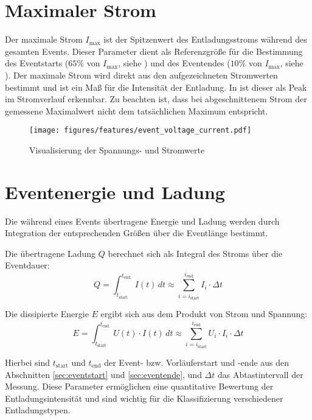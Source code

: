 \section{Maximaler Strom}
\label{sec:maxcurrent}
Der maximale Strom \(I_{\text{max}}\) ist der Spitzenwert des Entladungsstroms während des gesamten Events. Dieser Parameter dient als Referenzgröße für die Bestimmung des Eventstarts (\(65\%\) von \(I_{\text{max}}\), siehe ) und des Eventendes (\(10\%\) von \(I_{\text{max}}\), siehe ). Der maximale Strom wird direkt aus den aufgezeichneten Stromwerten bestimmt und ist ein Maß für die Intensität der Entladung. In  ist dieser als Peak im Stromverlauf erkennbar. Zu beachten ist, dass bei abgeschnittenem Strom der gemessene Maximalwert nicht dem tatsächlichen Maximum entspricht.

\begin{figure}[H]
  \centering
  \texttt{[image: figures/features/event\_voltage\_current.pdf]}
  \caption{Visualisierung der Spannungs- und Stromwerte}
  \label{fig:event_voltage_current}
\end{figure}


\section{Eventenergie und Ladung}
\label{sec:eventenergy_charge}
Die während eines Events übertragene Energie und Ladung werden durch Integration der entsprechenden Größen über die Eventlänge bestimmt.

Die übertragene Ladung \(Q\) berechnet sich als Integral des Stroms über die Eventdauer:
\begin{equation}
Q = \int_{t_{\text{start}}}^{t_{\text{end}}} I(t) \, dt \approx \sum_{i=i_{\text{start}}}^{i_{\text{end}}} I_i \cdot \Delta t
\end{equation}

Die dissipierte Energie \(E\) ergibt sich aus dem Produkt von Strom und Spannung:
\begin{equation}
E = \int_{t_{\text{start}}}^{t_{\text{end}}} U(t) \cdot I(t) \, dt \approx \sum_{i=i_{\text{start}}}^{i_{\text{end}}} U_i \cdot I_i \cdot \Delta t
\end{equation}

Hierbei sind \(t_{\text{start}}\) und \(t_{\text{end}}\) der Event- bzw. Vorläuferstart und -ende aus den Abschnitten \ref{sec:eventstart} und \ref{sec:eventende}, und \(\Delta t\) das Abtastintervall der Messung. Diese Parameter ermöglichen eine quantitative Bewertung der Entladungsintensität und sind wichtig für die Klassifizierung verschiedener Entladungstypen.




